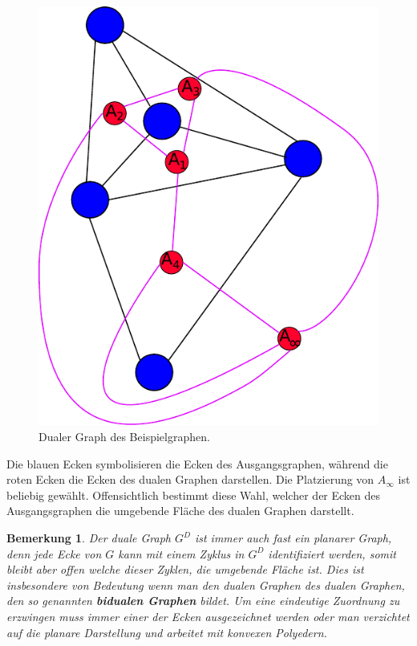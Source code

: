 \documentclass[11pt,a4paper,leqno]{report}
\newtheorem{remark}[theorem]{Bemerkung}
\numberwithin{equation}{chapter}
\begin{document}
\begin{figure}[H]
	\begin{center}
		\includegraphics[scale=0.4]{Abbildungen/graph_1_dual.pdf}
		\caption{Dualer Graph des Beispielgraphen.}
	\end{center}
\end{figure}
\noindent
Die blauen Ecken symbolisieren die Ecken des Ausgangsgraphen, während die roten Ecken die Ecken des dualen Graphen darstellen. Die Platzierung von $A_\infty$ ist beliebig gew\"ahlt. Offensichtlich bestimmt diese Wahl, welcher der Ecken des Ausgangsgraphen die umgebende Fl\"ache des dualen Graphen darstellt.
\begin{remark}
	Der duale Graph $G^D$ ist immer auch fast ein planarer Graph, denn jede Ecke von $G$ kann mit einem Zyklus in $G^D$ identifiziert werden, somit bleibt aber offen welche dieser Zyklen, die umgebende Fl\"ache ist. Dies ist insbesondere von Bedeutung wenn man den dualen Graphen des dualen Graphen, den so genannten \textbf{bidualen Graphen} bildet. Um eine eindeutige Zuordnung zu erzwingen muss immer einer der Ecken ausgezeichnet werden oder man verzichtet auf die planare Darstellung und arbeitet mit konvexen Polyedern. 
\end{remark}
\end{document}
